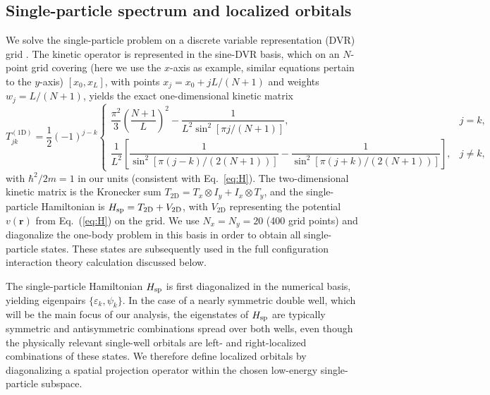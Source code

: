 \documentclass[fleqn,10pt]{wlscirep}
\begin{document}
\subsection{Single-particle spectrum and localized orbitals}
\label{sec:spectrum}

We solve the single-particle problem on a discrete variable representation (DVR) grid \cite{Light1985}. The kinetic operator is represented in the sine-DVR basis, which on an $N$-point grid covering (here we use the $x$-axis as example, similar equations pertain to the $y$-axis) $[x_0,x_L]$, with points $x_j = x_0 + jL/(N+1)$ and weights $w_j = L/(N+1)$, yields the exact one-dimensional kinetic matrix
\begin{equation}
  T^{(\mathrm{1D})}_{jk} = \frac{1}{2}(-1)^{j-k}
  \begin{cases}
    \dfrac{\pi^2}{3}\!\left(\dfrac{N+1}{L}\right)^{\!2}
    - \dfrac{1}{L^{2}\sin^{2}[\pi j/(N+1)]}, & j=k,\\[10pt]
    \dfrac{1}{L^{2}}\!\left[\dfrac{1}{\sin^{2}[\pi(j-k)/(2(N+1))]}
         -\dfrac{1}{\sin^{2}[\pi(j+k)/(2(N+1))]}\right], & j\neq k,
  \end{cases}
  \label{eq:dvr_T}
\end{equation}
with $\hbar^{2}/2m=1$ in our units (consistent with Eq.~\eqref{eq:H}). The two-dimensional kinetic matrix is the Kronecker sum $T_{2\mathrm D} = T_x\otimes I_y + I_x\otimes T_y$, and the single-particle Hamiltonian is $H_{\rm sp} = T_{2\mathrm D} + V_{2\mathrm D}$, with $V_{2\mathrm D}$ representing the potential $v(\bm r)$ from Eq.~(\ref{eq:H}) on the grid. We use $N_x=N_y=20$ (400 grid points) and diagonalize the one-body problem in this basis in order to obtain all single-particle states. These states are subsequently used in the full configuration interaction theory calculation \cite{SzaboOstlund1996} discussed below.

The single-particle Hamiltonian $H_{\rm sp}$ is first diagonalized in the numerical basis, yielding eigenpairs $\{\varepsilon_k,\psi_k\}$.  
In the case of a nearly symmetric double well, which will be the main focus of our analysis, the eigenstates of $H_{\rm sp}$ are typically
symmetric and antisymmetric combinations spread over both wells, even though the physically relevant single-well orbitals are left- and right-localized combinations of these states.  We therefore define localized orbitals by diagonalizing a spatial projection operator within the chosen low-energy single-particle subspace.
\end{document}
